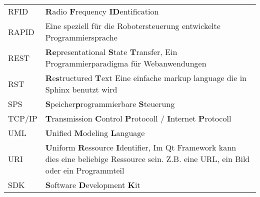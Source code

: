 \begin{center}
\begin{supertabular}{p{2.1cm}p{10.9cm}}
		RFID      & \textbf{R}adio \textbf{F}requency \textbf{ID}entification \\
		RAPID     & Eine speziell für die Robotersteuerung entwickelte Programmiersprache \\
		REST      & \textbf{Re}presentational \textbf{S}tate \textbf{T}ransfer, Ein Programmierparadigma für Webanwendungen \\
		RST       & \textbf{R}e\textbf{s}tructured \textbf{T}ext Eine einfache markup language die in Sphinx benutzt wird \\
		SPS       & \textbf{S}peicher\textbf{p}rogrammierbare \textbf{S}teuerung \\
		TCP/IP    & \textbf{T}ransmission \textbf{C}ontrol \textbf{P}rotocoll / \textbf{I}nternet \textbf{P}rotocoll \\
		UML       & \textbf{U}nified \textbf{M}odeling \textbf{L}anguage \\
		URI       & \textbf{U}niform \textbf{R}essource \textbf{I}dentifier, Im Qt Framework kann dies eine beliebige Ressource sein. Z.B. eine URL, ein Bild oder ein Programmteil \\
		SDK       & \textbf{S}oftware \textbf{D}evelopment \textbf{K}it \\
	\end{supertabular}
\end{center}
